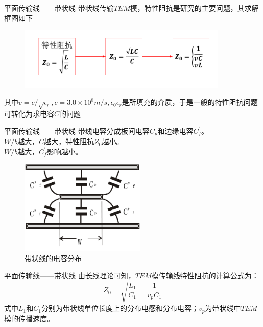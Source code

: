 \begin{frame}{平面传输线——带状线}
    带状线传输$TEM$模，特性阻抗是研究的主要问题，其求解框图如下
    \begin{figure}
        \includegraphics[width=10cm]{Cha6//fig6-35.pdf}
    \end{figure}
    其中$v=c/\sqrt{\epsilon_r},c=3.0\times 10^8m/s,\epsilon_0\epsilon_r$是所填充的介质，于是一般的特性阻抗问题可转化为求电容$C$的问题
    
\end{frame}

\begin{frame}{平面传输线——带状线}
    带线电容分成板间电容$C_p$和边缘电容$C_f^{'}$。\\
    $W/b$越大，$C$越大，特性阻抗$Z_0$越小。\\
    $W/b$越大，$C_f^{'}$影响越小。
    \begin{figure}
        \includegraphics[width=6cm]{Cha6//fig6-36.png}
        \caption{带状线的电容分布}
    \end{figure}
\end{frame}

\begin{frame}{平面传输线——带状线}
    由长线理论可知，$TEM$模传输线特性阻抗的计算公式为：
    $$Z_0=\sqrt{\frac{L_1}{C_1}}=\frac{1}{v_pC_1}$$
    式中$L_1$和$C_1$分别为带状线单位长度上的分布电感和分布电容；$v_p$为带状线中$TEM$模的传播速度。
\end{frame}

